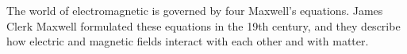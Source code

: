 The world of electromagnetic is governed by four Maxwell's equations.
James Clerk Maxwell formulated these equations in the 19th century, and
they describe how electric and magnetic fields interact with each other
and with matter.
